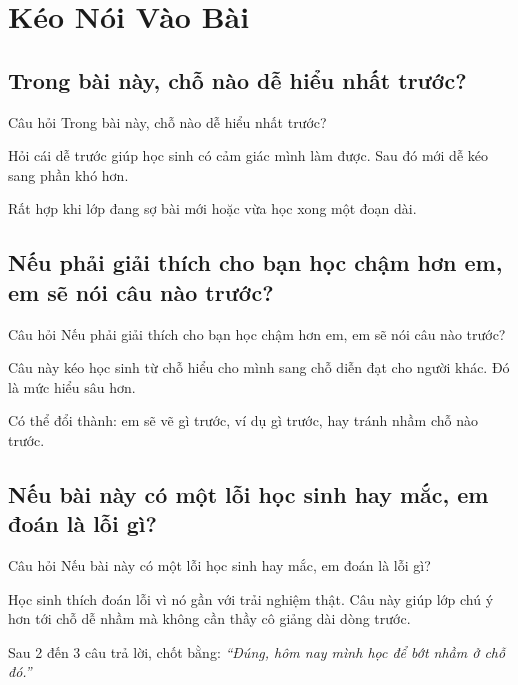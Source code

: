 \chapter{Kéo Nói Vào Bài}

\section{Trong bài này, chỗ nào dễ hiểu nhất trước?}
\begin{cauhoibox}{Câu hỏi}
Trong bài này, chỗ nào dễ hiểu nhất trước?
\end{cauhoibox}
\begin{taisaocoich}
Hỏi cái dễ trước giúp học sinh có cảm giác mình làm được. Sau đó mới dễ kéo sang phần khó hơn.
\end{taisaocoich}
\begin{goiybien}
Rất hợp khi lớp đang sợ bài mới hoặc vừa học xong một đoạn dài.
\end{goiybien}
\ngancach

\section{Nếu phải giải thích cho bạn học chậm hơn em, em sẽ nói câu nào trước?}
\begin{cauhoibox}{Câu hỏi}
Nếu phải giải thích cho bạn học chậm hơn em, em sẽ nói câu nào trước?
\end{cauhoibox}
\begin{taisaocoich}
Câu này kéo học sinh từ chỗ hiểu cho mình sang chỗ diễn đạt cho người khác. Đó là mức hiểu sâu hơn.
\end{taisaocoich}
\begin{goiybien}
Có thể đổi thành: em sẽ vẽ gì trước, ví dụ gì trước, hay tránh nhầm chỗ nào trước.
\end{goiybien}
\ngancach

\section{Nếu bài này có một lỗi học sinh hay mắc, em đoán là lỗi gì?}
\begin{cauhoibox}{Câu hỏi}
Nếu bài này có một lỗi học sinh hay mắc, em đoán là lỗi gì?
\end{cauhoibox}
\begin{taisaocoich}
Học sinh thích đoán lỗi vì nó gần với trải nghiệm thật. Câu này giúp lớp chú ý hơn tới chỗ dễ nhầm mà không cần thầy cô giảng dài dòng trước.
\end{taisaocoich}
\begin{goiybien}
Sau 2 đến 3 câu trả lời, chốt bằng: \textit{``Đúng, hôm nay mình học để bớt nhầm ở chỗ đó.''}
\end{goiybien}
\ngancach

